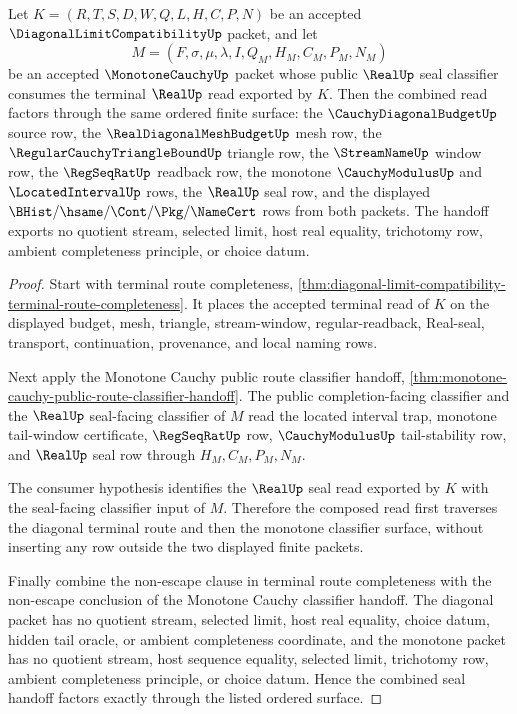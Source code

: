 \begin{theorem}
\label{thm:diagonal-limit-compatibility-monotone-cauchy-seal-handoff}
Let $K=(R,T,S,D,W,Q,L,H,C,P,N)$ be an accepted $\DiagonalLimitCompatibilityUp$ packet, and let
$$
M=(F,\sigma,\mu,\lambda,I,Q_M,H_M,C_M,P_M,N_M)
$$
be an accepted $\MonotoneCauchyUp$ packet whose public $\RealUp$ seal classifier consumes the terminal $\RealUp$ read exported by $K$. Then the combined read factors through the same ordered finite surface: the $\CauchyDiagonalBudgetUp$ source row, the $\RealDiagonalMeshBudgetUp$ mesh row, the $\RegularCauchyTriangleBoundUp$ triangle row, the $\StreamNameUp$ window row, the $\RegSeqRatUp$ readback row, the monotone $\CauchyModulusUp$ and $\LocatedIntervalUp$ rows, the $\RealUp$ seal row, and the displayed $\BHist/\hsame/\Cont/\Pkg/\NameCert$ rows from both packets. The handoff exports no quotient stream, selected limit, host real equality, trichotomy row, ambient completeness principle, or choice datum.
\end{theorem}
\begin{proof}
Start with terminal route completeness, \autoref{thm:diagonal-limit-compatibility-terminal-route-completeness}. It places the accepted terminal read of $K$ on the displayed budget, mesh, triangle, stream-window, regular-readback, Real-seal, transport, continuation, provenance, and local naming rows.

Next apply the Monotone Cauchy public route classifier handoff, \autoref{thm:monotone-cauchy-public-route-classifier-handoff}. The public completion-facing classifier and the $\RealUp$ seal-facing classifier of $M$ read the located interval trap, monotone tail-window certificate, $\RegSeqRatUp$ row, $\CauchyModulusUp$ tail-stability row, and $\RealUp$ seal row through $H_M,C_M,P_M,N_M$.

The consumer hypothesis identifies the $\RealUp$ seal read exported by $K$ with the seal-facing classifier input of $M$. Therefore the composed read first traverses the diagonal terminal route and then the monotone classifier surface, without inserting any row outside the two displayed finite packets.

Finally combine the non-escape clause in terminal route completeness with the non-escape conclusion of the Monotone Cauchy classifier handoff. The diagonal packet has no quotient stream, selected limit, host real equality, choice datum, hidden tail oracle, or ambient completeness coordinate, and the monotone packet has no quotient stream, host sequence equality, selected limit, trichotomy row, ambient completeness principle, or choice datum. Hence the combined seal handoff factors exactly through the listed ordered surface.
\end{proof}

